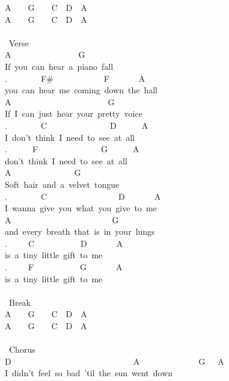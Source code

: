 {A\ \ \ \ G\ \ \ \ C\ \ D\ \ A\\
A\ \ \ \ G\ \ \ \ C\ \ D\ \ A\\
\\
\lbrack\ Verse\rbrack\\
A\ \ \ \ \ \ \ \ \ \ \ \ \ \ \ \ G\\
If\ you\ can\ hear\ a\ piano\ fall\ \\
.\ \ \ \ \ \ \ \ F\#\ \ \ \ \ \ \ \ \ \ \ \ F\ \ \ \ \ \ \ A\\
you\ can\ hear\ me\ coming\ down\ the\ hall\\
A\ \ \ \ \ \ \ \ \ \ \ \ \ \ \ \ \ \ \ \ \ \ \ G\\
If\ I\ can\ just\ hear\ your\ pretty\ voice\\
.\ \ \ \ \ \ \ \ C\ \ \ \ \ \ \ \ \ \ \ \ \ \ \ D\ \ \ \ \ \ A\\
I\ don't\ think\ I\ need\ to\ see\ at\ all\\
.\ \ \ \ \ \ F\ \ \ \ \ \ \ \ \ \ \ \ \ \ \ G\ \ \ \ \ \ A\\
don't\ think\ I\ need\ to\ see\ at\ all\\
A\ \ \ \ \ \ \ \ \ \ \ \ \ \ \ G\\
Soft\ hair\ and\ a\ velvet\ tongue\\
.\ \ \ \ \ \ \ \ C\ \ \ \ \ \ \ \ \ \ \ \ \ \ \ \ \ D\ \ \ \ \ \ \ A\\
I\ wanna\ give\ you\ what\ you\ give\ to\ me\\
A\ \ \ \ \ \ \ \ \ \ \ \ \ \ \ \ \ \ \ \ \ \ \ \ G\\
and\ every\ breath\ that\ is\ in\ your\ lungs\\
.\ \ \ \ \ C\ \ \ \ \ \ \ \ \ \ \ D\ \ \ \ \ \ \ A\\
is\ a\ tiny\ little\ gift\ to\ me\\
.\ \ \ \ \ F\ \ \ \ \ \ \ \ \ \ \ G\ \ \ \ \ \ \ A\ \ \\
is\ a\ tiny\ little\ gift\ to\ me\\
\\
\lbrack\ Break\rbrack\\
A\ \ \ \ G\ \ \ \ C\ \ D\ \ A\\
A\ \ \ \ G\ \ \ \ C\ \ D\ \ A\\
\\
\lbrack\ Chorus\rbrack\\
D\ \ \ \ \ \ \ \ \ \ \ \ \ \ \ \ \ \ \ \ \ \ \ \ \ \ \ \ \ A\ \ \ \ \ \ \ \ \ \ \ \ \ \ G\ \ \ A\\
I\ didn't\ feel\ so\ bad\ 'til\ the\ sun\ went\ down\\
}
